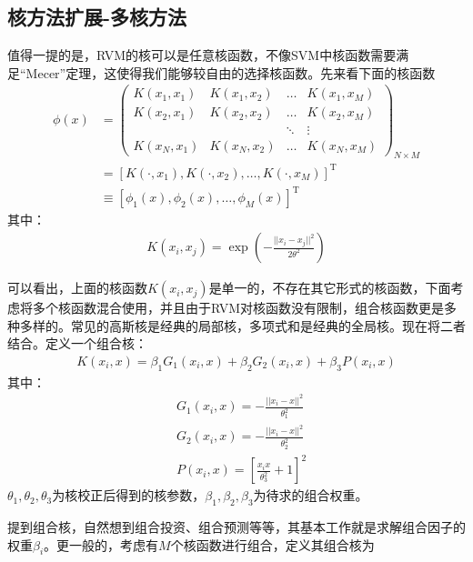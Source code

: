     \subsection{核方法扩展-多核方法}
        \par
        值得一提的是，RVM的核可以是任意核函数，不像SVM中核函数需要满足“Mecer”定理，这使得我们能够较自由的选择核函数。先来看下面的核函数
        \begin{align*}
        \phi(x) &=
        \begin{pmatrix}
        K(x_1,x_1)& K(x_1,x_2) & \dots& K(x_1,x_M)\\
        K(x_2,x_1)& K(x_2,x_2) & \dots& K(x_2,x_M)\\
        &&　\ddots&\vdots\\
        K(x_N,x_1)& K(x_N,x_2) & \dots &K(x_N,x_M)
        \end{pmatrix}
        _{N \times M} \\
        &=[K(\cdot,x_1),K(\cdot,x_2) , \dots ,K(\cdot,x_M)]^\mathrm{T} \\
        &\equiv [\phi_1(x),\phi_2(x),\dots,\phi_M(x)]^\mathrm{T}
        \end{align*}
        其中：
        \begin{align*}
        K(x_i,x_j) = \exp \left( -\frac{||x_i - x_j||^2}{2\theta^2} \right)
        \end{align*}
        \par
        可以看出，上面的核函数$K(x_i,x_j)$是单一的，不存在其它形式的核函数，下面考虑将多个核函数混合使用，并且由于RVM对核函数没有限制，组合核函数更是多种多样的。常见的高斯核是经典的局部核，多项式和是经典的全局核。现在将二者结合。定义一个组合核：
        \begin{align*}
        K(x_i,x) = \beta_1G_1(x_i,x) + \beta_2G_2(x_i,x) + \beta_3 P(x_i,x)
        \end{align*}
        其中：
        \begin{align*}
        &G_1(x_i,x)  = -\frac{||x_i-x||^2}{\theta_1^2} \\
        &G_2(x_i,x) = -\frac{||x_i - x||^2}{\theta_2^2}\\
        &P(x_i,x) = \left[ \frac{x_i x}{\theta_3^2}+ 1 \right]^2
        \end{align*}
        $\theta_1,\theta_2,\theta_3$为核校正后得到的核参数，$\beta_1,\beta_2,\beta_3$为待求的组合权重。
        \par
        提到组合核，自然想到组合投资、组合预测等等，其基本工作就是求解组合因子的权重$\beta_i$。更一般的，考虑有$M$个核函数进行组合，定义其组合核为
